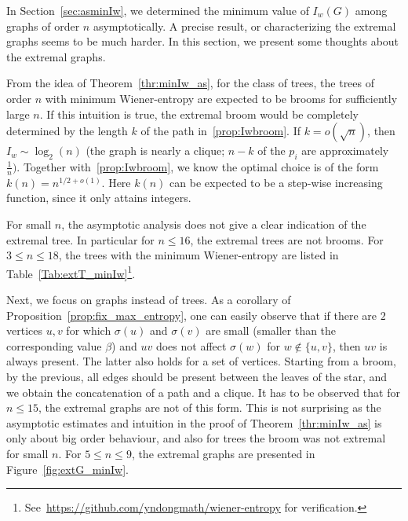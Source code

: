 \documentclass{article}
\def \b{\beta}
\begin{document}
{In Section~\ref{sec:asminIw}, we determined the minimum value of $I_w(G)$ among graphs of order $n$ asymptotically.
A precise result, or characterizing the extremal graphs seems to be much harder. In this section, we present some thoughts about the extremal graphs.

From the idea of Theorem~\ref{thr:minIw_as},
for the class of trees, the trees of order $n$ with minimum Wiener-entropy are expected to be brooms for sufficiently large $n$.
If this intuition is true, the extremal broom would be completely determined by the length $k$ of the path in~\cref{prop:Iwbroom}.
If $k=o(\sqrt n)$, then $I_w \sim \log_2(n)$ (the graph is nearly a clique; $n-k$ of the $p_i$ are approximately $\frac{1}{n}).$
Together with~\cref{prop:Iwbroom}, we know the optimal choice is of the form $k(n)=n^{1/2+o(1)}$. Here $k(n)$ can be expected to be a step-wise increasing function, since it only attains integers.

For small $n$, the asymptotic analysis does not give a clear indication of the extremal tree.
In particular for $n \le 16$, the extremal trees are not brooms.
For $3\leq n\leq 18$, the trees with the minimum Wiener-entropy are listed in Table~\ref{Tab:extT_minIw}\footnote{See~\url{https://github.com/yndongmath/wiener-entropy} for verification.}.














Next, we focus on graphs instead of trees. 
As a corollary of Proposition~\ref{prop:fix_max_entropy}, one can easily observe that if there are $2$ vertices $u,v$ for which $\sigma(u)$ and $\sigma(v)$ are small (smaller than the corresponding value $\b$) and $uv$ does not affect $\sigma(w)$ for $w \not \in \{u,v\}$, then $uv$ is always present.
The latter also holds for a set of vertices.
Starting from a broom, by the previous, all edges should be present between the leaves of the star, and we obtain the concatenation of a path and a clique.
It has to be observed that for $n \le 15$, the extremal graphs are not of this form.
This is not surprising as the asymptotic estimates and intuition in the proof of Theorem~\ref{thr:minIw_as} is only about big order behaviour, and also for trees the broom was not extremal for small $n$.
For $5 \le n \le 9$, the extremal graphs are presented in Figure~\ref{fig:extG_minIw}. 


}
\end{document}
